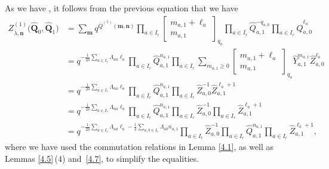 \documentclass[pdftex]{sigma}
\numberwithin{equation}{section}
\begin{document}
As we have , it follows from the previous equation that we have
\begin{align}
Z_{\overline{\lambda},\mathbf{n}}^{(1)}\bigl(\widehat{\mathbf{Q}}_0,\widehat{\mathbf{Q}}_1\bigr)
&=\sum_{\mathbf{m}}q^{\overline{Q}^{(1)}(\mathbf{m},\mathbf{n})}\prod_{a\in I_r}\begin{bmatrix}m_{a,1}+\ell_a\\m_{a,1}\end{bmatrix}_{q_a}\prod_{a\in I_r}\widehat{Q}_{a,1}^{-q_{a,0}}\prod_{a\in I_r}\widehat{Q}_{a,0}^{\ell_a}\nonumber\\
&=q^{-\frac{1}{2\delta}\sum_{a\in I_r}\Lambda_{aa}\ell_a}\prod_{a\in I_r}\widehat{Q}_{a,1}^{n_{a,1}}\prod_{a\in I_r}\sum_{m_{a,1}\geq0}\begin{bmatrix}m_{a,1}+\ell_a\\m_{a,1}\end{bmatrix}_{q_a}\widehat{Y}_{a,1}^{m_{a,1}}\widehat{Z}_{a,0}^{\ell_a}\nonumber\\
&=q^{-\frac{1}{2\delta}\sum_{a\in I_r}\Lambda_{aa}\ell_a}\prod_{a\in I_r}\widehat{Q}_{a,1}^{n_{a,1}}\prod_{a\in I_r}\widehat{Z}_{a,0}^{-1}\widehat{Z}_{a,1}^{\ell_a+1}\nonumber\\
&=q^{-\frac{1}{2\delta}\sum_{a\in I_r}\Lambda_{aa}\ell_a}\prod_{a\in I_r}\widehat{Q}_{a,1}^{n_{a,1}}\prod_{a\in I_r}\widehat{Z}_{a,0}^{-1}\prod_{a\in I_r}\widehat{Z}_{a,1}^{\ell_a+1}\nonumber\\
&=q^{-\frac{1}{2\delta}\sum_{a\in I_r}\Lambda_{aa}\ell_a-\frac{1}{\delta}\sum_{a,b\in I_r}\Lambda_{ab}n_{a,1}}\prod_{a\in I_r}\widehat{Z}_{a,0}^{-1}\prod_{a\in I_r}\widehat{Q}_{a,1}^{n_{a,1}}\prod_{a\in I_r}\widehat{Z}_{a,1}^{\ell_a+1},\label{eq:4.17}
\end{align}
where we have used the commutation relations in Lemma \ref{4.1}, as well as Lemmas \ref{4.5}\,(4) and~\ref{4.7}, to simplify the equalities.
\end{document}
